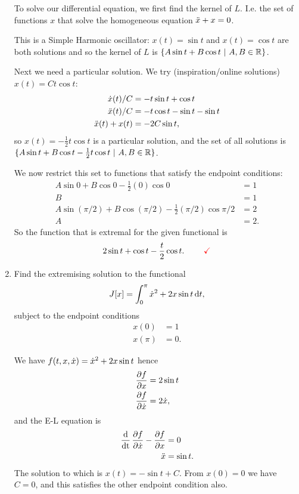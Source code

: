 \begin{enumerate}
  To solve our differential equation, we first find the kernel of $L$. I.e. the set of functions $x$ that solve the homogeneous equation $\ddot{x} + x = 0$.

  This is a Simple Harmonic oscillator: $x(t) = \sin t$ and $x(t) = \cos t$ are both solutions and so the kernel of $L$
  is $\{A\sin t + B\cos t ~|~ A, B \in \mathbb{R}\}$.


  Next we need a particular solution. We try (inspiration/online solutions) $x(t) = Ct\cos t$:
  \begin{align*}
    \dot{x}(t)/C      &= -t\sin t + \cos t \\
    \ddot{x}(t)/C      &= -t\cos t - \sin t - \sin t \\
    \ddot{x}(t) + x(t) &= -2C\sin t,
  \end{align*}
  so $x(t) = -\frac{1}{2}t\cos t$ is a particular solution, and the set of all solutions is
  $\{A\sin t + B\cos t - \frac{1}{2}t\cos t ~|~ A, B \in \mathbb{R}\}$.

  We now restrict this set to functions that satisfy the endpoint conditions:
  \begin{align*}
    A\sin 0 + B\cos 0 - \frac{1}{2}(0)\cos 0                     &= 1 \\
    B                                                            &= 1 \\
    A\sin (\pi/2) + B\cos (\pi/2) - \frac{1}{2}(\pi/2)\cos \pi/2 &= 2 \\
    A                                                            &= 2.
  \end{align*}
  So the function that is extremal for the given functional is
  \begin{align*}
    2\sin t + \cos t - \frac{t}{2}\cos t. ~~~~~~~ \textcolor{red}{\checkmark}
  \end{align*}
\item
  \begin{mdframed}
    Find the extremising solution to the functional
    \begin{align*}
      J[x] = \int_0^{\pi} \xdot^2 + 2x\sin t \dt,
    \end{align*}
    subject to the endpoint conditions
    \begin{align*}
      x(0) &= 1 \\
      x(\pi) &= 0.
    \end{align*}
  \end{mdframed}
  We have $f(t, x, \dot{x}) = \dot{x}^2 + 2x\sin t$ hence
  \begin{align*}
    \frac{\partial f}{\partial x}  &= 2\sin t \\
    \frac{\partial f}{\partial \dot{x}} &= 2\dot{x},
  \end{align*}
  and the E-L equation is
  \begin{align*}
    \operatorname{\frac{\text{d}}{\text{dt}}} \frac{\partial f}{\partial \dot{x}} - \frac{\partial f}{\partial x} &= 0 \\
    \ddot{x} &= \sin t.
  \end{align*}
  The solution to which is $x(t) = -\sin t + C$. From $x(0) = 0$ we have $C = 0$, and
  this satisfies the other endpoint condition also.


\end{enumerate}
